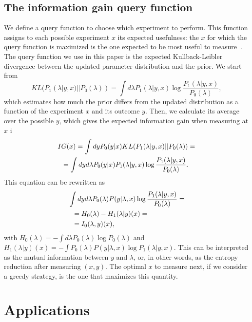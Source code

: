 \documentclass[10pt]{iopart}  %
\begin{document}
\subsection{The information gain query function}
We define a query function to choose which experiment to perform. This function assigns to each possible experiment $x$ its expected usefulness: the $x$ for which the query function is maximized is the one expected to be most useful to measure~\cite{settles_active_2012}.
The query function we use in this paper is the expected Kullback-Leibler divergence between the updated parameter distribution and the prior.
We start from
\begin{equation}
    KL(P_1(\lambda|y,x)||P_0(\lambda))= \int d\lambda P_1(\lambda|y,x) \log \frac{P_1(\lambda|y,x)}{P_0(\lambda)},
\end{equation}
which estimates how much the prior differs from the updated distribution as a function of the experiment $x$ and its outcome $y$.
Then, we calculate its average over the possible $y$, which gives the expected information gain when measuring at $x$ i
\begin{align}
     & IG(x) = \int dy P_0(y|x) KL(P_1(\lambda|y,x)||P_0(\lambda)) =\noindent \\
     & \;\;=
    \int dy d\lambda P_0(y|x) P_1(\lambda|y,x) \log \frac{P_1(\lambda|y,x)}{P_0(\lambda)}.
\end{align}
This equation can be rewritten as
\begin{align}
    \label{eq:app-information-gain}
     & \int dy d\lambda P_0(\lambda)P(y|\lambda,x) \log \frac{P_1(\lambda|y,x)}{P_0(\lambda)}  =\noindent \\
     & \;\;= H_0(\lambda) - H_1(\lambda|y)(x) =\noindent                                                  \\
     & \;\;= I_0(\lambda,y)(x),
\end{align}
with $ H_0(\lambda) = -\int d\lambda P_0(\lambda)\log P_0(\lambda) $ and $H_1(\lambda|y)(x) = - \int P_0(\lambda) P(y|\lambda,x)\log P_1(\lambda|y,x)$.
This can be interpreted as the mutual information between $y$ and $\lambda$, or, in other words, as the entropy reduction after measuring $(x,y)$.
The optimal $x$ to measure next, if we consider a greedy strategy, is the one that maximizes this quantity.


\section{Applications}
\label{app:examples}
\end{document}
